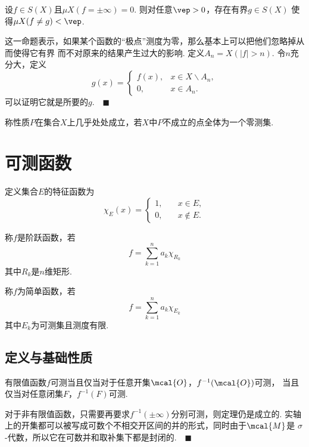   \begin{thm}
    设$f\in S(X)$且$\mu X(f=\pm\infty)=0$. 则对任意$\vep>0$，存在有界$g\in S(X)$
    使得$\mu X(f\ne g)<\vep$.
  \end{thm}
  \remark
    这一命题表示，如果某个函数的“极点”测度为零，那么基本上可以把他们忽略掉从而使得它有界
    而不对原来的结果产生过大的影响.
  \proof
    定义$A_n = X(|f|>n)$. 令$n$充分大，定义
    \[
      g(x)=\begin{cases}
        f(x), & x\in X\backslash A_n,\\
        0,    & x\in A_n.
      \end{cases}
    \]
    可以证明它就是所要的$g$.$\quad\blacksquare$

  \begin{defi}[几乎处处]
    称性质$P$在集合$X$上几乎处处成立，若$X$中$P$不成立的点全体为一个零测集.
  \end{defi}


\newpage
\section{可测函数}

  \begin{defi}[特征函数]
    定义集合$E$的特征函数为
    \[
      \chi_E(x) = \begin{cases}
        1,& \quad x\in E, \\
        0,& \quad x\notin E.
      \end{cases}
    \]
  \end{defi}

  \begin{defi}[阶跃函数]
    称$f$是阶跃函数，若
    \[
      f = \sum_{k=1}^n a_k\chi_{R_k}
    \]
    其中$R_k$是$n$维矩形.
  \end{defi}

  \begin{defi}[简单函数]
    称$f$为简单函数，若
    \[
      f = \sum_{k=1}^n a_k\chi_{E_k}
    \]
    其中$E_k$为可测集且测度有限.
  \end{defi}

\subsection{定义与基础性质}

  \begin{thm}
    有限值函数$f$可测当且仅当对于任意开集$\mcal{O}$，$f^{-1}(\mcal{O})$可测，
    当且仅当对任意闭集$F$，$f^{-1}(F)$可测.
  \end{thm}
  \remark
    对于非有限值函数，只需要再要求$f^{-1}(\pm\infty)$分别可测，则定理仍是成立的.
  \proof
    实轴上的开集都可以被写成可数个不相交开区间的并的形式，同时由于$\mcal{M}$是
    $\sigma$-代数，所以它在可数并和取补集下都是封闭的.$\quad\blacksquare$

